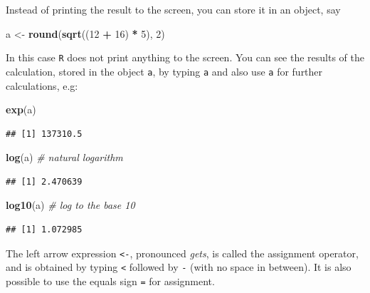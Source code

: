 \documentclass[
]{book}
\newenvironment{Shaded}{\begin{snugshade}}{\end{snugshade}}
\newcommand{\CommentTok}[1]{\textcolor[rgb]{0.56,0.35,0.01}{\textit{#1}}}
\newcommand{\DecValTok}[1]{\textcolor[rgb]{0.00,0.00,0.81}{#1}}
\newcommand{\FunctionTok}[1]{\textcolor[rgb]{0.13,0.29,0.53}{\textbf{#1}}}
\newcommand{\NormalTok}[1]{#1}
\newcommand{\OtherTok}[1]{\textcolor[rgb]{0.56,0.35,0.01}{#1}}
\newcommand{\SpecialCharTok}[1]{\textcolor[rgb]{0.81,0.36,0.00}{\textbf{#1}}}
\theoremstyle{definition}
\theoremstyle{definition}
\theoremstyle{definition}
\theoremstyle{definition}
\theoremstyle{remark}
\begin{document}
Instead of printing the result to the screen, you can store it in an object, say

\begin{Shaded}
\begin{Highlighting}[]
\NormalTok{a }\OtherTok{\textless{}{-}} \FunctionTok{round}\NormalTok{(}\FunctionTok{sqrt}\NormalTok{((}\DecValTok{12} \SpecialCharTok{+} \DecValTok{16}\NormalTok{) }\SpecialCharTok{*} \DecValTok{5}\NormalTok{), }\DecValTok{2}\NormalTok{)}
\end{Highlighting}
\end{Shaded}

In this case \texttt{R} does not print anything to the screen. You can
see the results of the calculation, stored in the object \texttt{a},
by typing \texttt{a} and also use \texttt{a} for further calculations,
e.g:

\begin{Shaded}
\begin{Highlighting}[]
\FunctionTok{exp}\NormalTok{(a)}
\end{Highlighting}
\end{Shaded}

\begin{verbatim}
## [1] 137310.5
\end{verbatim}

\begin{Shaded}
\begin{Highlighting}[]
\FunctionTok{log}\NormalTok{(a) }\CommentTok{\# natural logarithm}
\end{Highlighting}
\end{Shaded}

\begin{verbatim}
## [1] 2.470639
\end{verbatim}

\begin{Shaded}
\begin{Highlighting}[]
\FunctionTok{log10}\NormalTok{(a) }\CommentTok{\# log to the base 10}
\end{Highlighting}
\end{Shaded}

\begin{verbatim}
## [1] 1.072985
\end{verbatim}

The left arrow expression \texttt{\textless{}-}, pronounced \emph{gets}, is called
the assignment operator, and is obtained by typing \texttt{\textless{}} followed
by \texttt{-} (with no space in between). It is also possible to use
the equals sign \texttt{=} for assignment.
\end{document}
